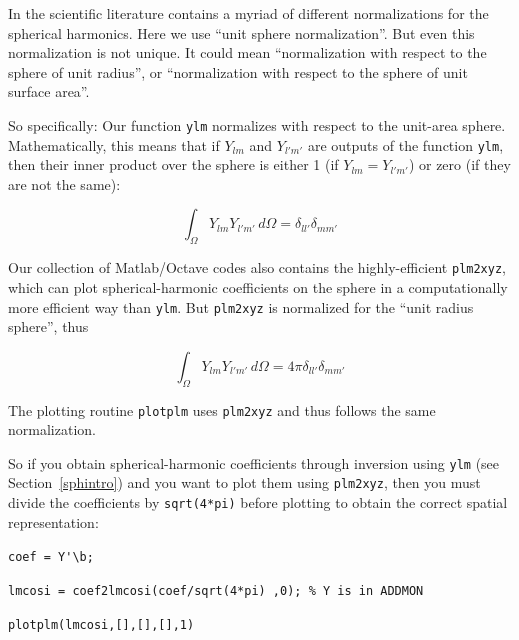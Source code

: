 \documentclass[11pt]{article}
\begin{document}
In the scientific literature contains a myriad of different
normalizations for the spherical harmonics. Here we use ``unit sphere
normalization''. But even this normalization is not unique. It could
mean ``normalization with respect to the sphere of unit radius'', or
``normalization with respect to the sphere of unit surface area''.

So specifically: Our function \verb#ylm# normalizes with respect to
the unit-area sphere. Mathematically, this means that if $Y_{lm}$ and
$Y_{l'm'}$ are outputs of the function \verb#ylm#, then their inner
product over the sphere is either 1 (if $Y_{lm} = Y_{l'm'}$) or zero
(if they are not the same):

\[
\int_\Omega Y_{lm} Y_{l'm'} \, d\Omega = \delta_{ll'}\delta_{mm'}
\]


Our collection of Matlab/Octave codes also contains the
highly-efficient \verb#plm2xyz#, which can plot spherical-harmonic
coefficients on the sphere in a computationally more efficient way
than \verb#ylm#. But \verb#plm2xyz# is normalized for the ``unit
radius sphere'', thus


\[
\int_\Omega Y_{lm} Y_{l'm'} \, d\Omega = 4\pi \delta_{ll'}\delta_{mm'}
\]

The plotting routine \verb#plotplm# uses \verb#plm2xyz# and thus
follows the same normalization.

So if you obtain spherical-harmonic coefficients through inversion
using \verb#ylm# (see Section~\ref{sphintro}) and you want to plot
them using \verb#plm2xyz#, then you must divide the coefficients by
\verb#sqrt(4*pi)# before plotting to obtain the correct spatial
representation:

\quad \verb#coef = Y'\b;#

\quad \verb#lmcosi = coef2lmcosi(coef/sqrt(4*pi) ,0); % Y is in ADDMON#

\quad \verb#plotplm(lmcosi,[],[],[],1)#
\end{document}
